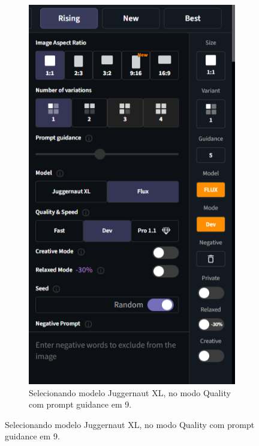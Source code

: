 \begin{figure}[htbp]
    \centering
    \caption{\small Processo da utilização 6 do CGDream (Personagem)}
    \label{fig:cgDream6}
    \begin{subfigure}{0.45\linewidth}
        \includegraphics[width=1\linewidth]{figs/cgDream/tela_char_Jug9_1.png}
        \caption{\small Selecionando modelo Juggernaut XL, no modo Quality com prompt guidance em 9.}
        \label{fig:cgDream6a}

\end{subfigure}
\end{figure}
